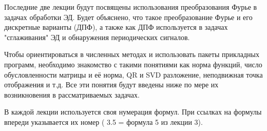Последние две лекции будут посвящены использования преобразования Фурье в задачах обработки ЭД. Будет объяснено, что такое преобразование Фурье и его дискретные варианты (ДПФ), а также как ДПФ используется в задачах "сглаживания" ЭД и обнаружения периодических сигналов.

Чтобы ориентироваться в численных методах и использовать пакеты прикладных программ, необходимо знакомство с такими понятиями как норма функций, число обусловленности матрицы и её норма, QR и SVD разложение, неподвижная точка отображения и т.д. Все эти понятия будут введены ниже по мере их возникновения в рассматриваемых задачах.

В каждой лекции используется своя нумерация формул. При ссылках на формулы впереди указывается их номер ( 3.5 = формула 5 из лекции 3).







